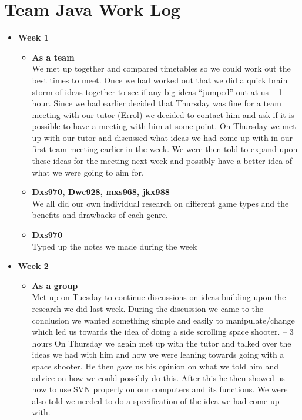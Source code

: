 \section{Team Java Work Log}
\begin{itemize}
\item \textbf{Week 1}
  \begin{itemize}
  \item \textbf{As a team} \\We met up together and compared
    timetables so we could work out the best times to meet. Once we
    had worked out that we did a quick brain storm of ideas together
    to see if any big ideas “jumped” out at us – 1 hour.  Since we had
    earlier decided that Thursday was fine for a team meeting with our
    tutor (Errol) we decided to contact him and ask if it is possible
    to have a meeting with him at some point.  On Thursday we met up
    with our tutor and discussed what ideas we had come up with in our
    first team meeting earlier in the week. We were then told to
    expand upon these ideas for the meeting next week and possibly
    have a better idea of what we were going to aim for.
  \item \textbf{Dxs970, Dwc928, mxs968, jkx988} \\We all did our own
    individual research on different game types and the benefits and
    drawbacks of each genre.
  \item \textbf{Dxs970} \\Typed up the notes we made during the week
  \end{itemize}
\item \textbf{Week 2}
  \begin{itemize}
  \item \textbf{As a group}\\
    Met up on Tuesday to continue discussions on ideas building upon
    the research we did last week. During the discussion we came to
    the conclusion we wanted something simple and easily to
    manipulate/change which led us towards the idea of doing a side
    scrolling space shooter. – 3 hours On Thursday we again met up
    with the tutor and talked over the ideas we had with him and how
    we were leaning towards going with a space shooter. He then gave
    us his opinion on what we told him and advice on how we could
    possibly do this. After this he then showed us how to use SVN
    properly on our computers and its functions.  We were also told we
    needed to do a specification of the idea we had come up with.

\end{itemize}
\end{itemize}
